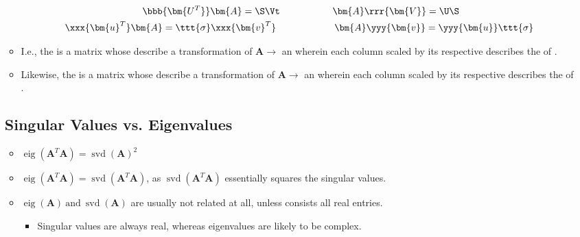 \begin{itemize}
\begin{itemize}
\begin{align*}
      \bbb{\bm{U^T}}\bm{A} = \S \Vt \hspace{20pt}&\hspace{35pt}\bm{A}\rrr{\bm{V}} = \U \S  \\
      \xxx{\bm{u}^T}\bm{A}=\ttt{\sigma} \xxx{\bm{v}^T} \hspace{24pt}&\hspace{37pt} \bm{A}\yyy{\bm{v}}= \yyy{\bm{u}} \ttt{\sigma}  
    \end{align*}
    \item I.e.,  the  is a matrix whose  describe a transformation of \(\bm{A} \to\) an  wherein each column scaled by its respective  describes the  of .
    \item Likewise, the  is a matrix whose  describe a transformation of \(\bm{A} \to\) an  wherein each column scaled by its respective  describes the  of .   
  \end{itemize}

  \subsection{Singular Values vs. Eigenvalues}\label{Singular Values vs. Eigenvalues}
  \begin{itemize}
    \item \(\operatorname{eig}(\bm{A}^T \bm{A}) = \operatorname{svd}(\bm{A})^2 \)
    \item \(\operatorname{eig}(\bm{A}^T \bm{A}) = \operatorname{svd}(\bm{A}^T \bm{A}) \), as \(\operatorname{svd}(\bm{A}^T \bm{A})\) essentially squares the singular values.
    \item \(\operatorname{eig}(\bm{A})~\text{and}~\operatorname{svd}(\bm{A}) \) are usually not related at all, unless  consists all real entries.
    \begin{itemize}
      \item Singular values are always real, whereas eigenvalues are likely to be complex.
    \end{itemize}
  \end{itemize}
  


\end{itemize}
